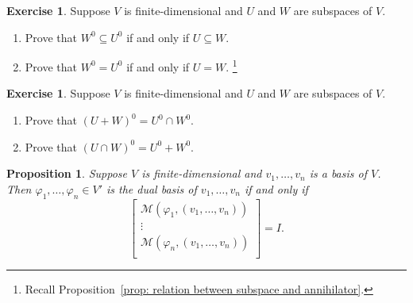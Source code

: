 \documentclass{tufte-handout}
\theoremstyle{plain} %
\newtheorem{prop}[thm]{Proposition}
\theoremstyle{definition}
\newtheorem{exer}[thm]{Exercise}
\theoremstyle{remark}
\newcommand{\bra}[1]{\mathopen{}\left(#1\right)}
\newcommand{\cbra}[1]{\mathopen{}\left\{#1\right\}}
\renewcommand{\phi}{\varphi}
\newcommand{\M}{\mathcal{M}}
\begin{document}
\begin{exer}
	Suppose $V$ is finite-dimensional and $U$ and $W$ are subspaces of $V$.
	\begin{enumerate}
		\item Prove that $W^0\subseteq U^0$ if and only if $U\subseteq W$.
		\item Prove that $W^0=U^0$ if and only if $U=W$.%
    	\footnote{Recall Proposition~\ref{prop: relation between subspace and annihilator}.}
	\end{enumerate}
\end{exer}

\begin{exer}
	Suppose $V$ is finite-dimensional and $U$ and $W$ are subspaces of $V$.\
	\begin{enumerate}
		\item Prove that $\bra{U+W}^0=U^0\cap W^0$.
		\item Prove that $\bra{U\cap W}^0=U^0+W^0$.
	\end{enumerate}
\end{exer}

\begin{prop}\label{prop: matrix of dual basis}
	Suppose $V$ is finite-dimensional and $v_1,\dots,v_n$ is a basis of $V$. Then $\phi_1,\dots,\phi_n\in V'$ is the dual basis of $v_1,\dots,v_n$ if and only if
	\[\begin{bmatrix}
		\M(\phi_1,(v_1,\dots,v_n))\\
		\vdots\\
		\M(\phi_n,(v_1,\dots,v_n))\\
	\end{bmatrix}=I.\]
\end{prop}
\end{document}

